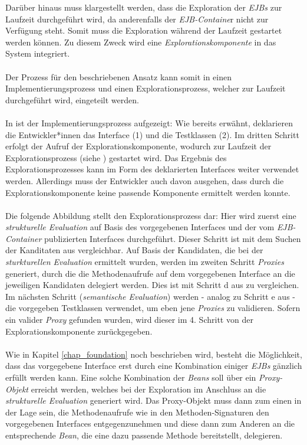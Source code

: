 Darüber hinaus muss klargestellt werden, dass die Exploration der \emph{EJBs} zur Laufzeit durchgeführt wird, da anderenfalls der \emph{EJB-Containe}r nicht zur Verfügung steht. Somit muss die Exploration während der Laufzeit gestartet werden können. Zu diesem Zweck wird eine \emph{Explorationskomponente} in das System integriert. 
\\\\
Der Prozess für den beschriebenen Ansatz kann somit in einen Implementierungsprozess und einen Explorationsprozess, welcher zur Laufzeit durchgeführt wird, eingeteilt werden.
\\\\
In  ist der Implementierungsprozess aufgezeigt:
\noindent
Wie bereits erwähnt, deklarieren die Entwickler*innen das Interface (1) und die Testklassen (2). Im dritten Schritt erfolgt der Aufruf der Explorationskomponente, wodurch zur Laufzeit der Explorationsprozess (siehe ) gestartet wird. Das Ergebnis des Explorationsprozesses kann im Form des deklarierten Interfaces weiter verwendet werden. Allerdings muss der Entwickler auch davon ausgehen, dass durch die Explorationskomponente keine passende Komponente ermittelt werden konnte.
\\\\
Die folgende Abbildung stellt den Explorationsprozess dar:
\noindent
Hier wird zuerst eine \emph{strukturelle Evaluation} auf Basis des vorgegebenen Interfaces und der vom \emph{EJB-Container} publizierten Interfaces durchgeführt. 
Dieser Schritt ist mit dem Suchen der Kanditaten aus  vergleichbar. Auf Basis der Kandidaten, die bei der \emph{sturkturellen Evaluation} ermittelt wurden, werden im zweiten Schritt \emph{Proxies} generiert, durch die die Methodenaufrufe auf dem vorgegebenen Interface an die jeweiligen Kandidaten delegiert werden. Dies ist mit Schritt d aus  zu vergleichen. Im nächsten Schritt (\emph{semantische Evaluation}) werden - analog zu Schritt e aus  - die vorgegeben Testklassen verwendet, um eben jene \emph{Proxies} zu validieren. Sofern ein valider \emph{Proxy} gefunden wurden, wird dieser im 4. Schritt von der Explorationskomponente zurückgegeben.
\\\\
Wie in Kapitel \ref{chap_foundation} noch beschrieben wird, besteht die Möglichkeit, dass das vorgegebene Interface erst durch eine Kombination einiger \emph{EJBs} gänzlich erfüllt werden kann. Eine solche Kombination der \emph{Beans} soll über ein \emph{Proxy-Objekt} erreicht werden, welches bei der Exploration im Anschluss an die \emph{strukturelle Evaluation} generiert wird. Das Proxy-Objekt muss dann zum einen in der Lage sein, die Methodenaufrufe wie in den Methoden-Signaturen den vorgegebenen Interfaces entgegenzunehmen und diese dann zum Anderen an die entsprechende \emph{Bean}, die eine dazu passende Methode bereitstellt, delegieren.
